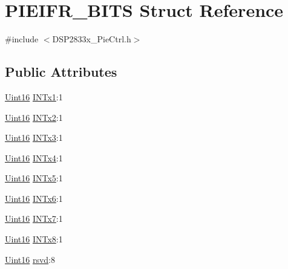 \hypertarget{struct_p_i_e_i_f_r___b_i_t_s}{}\section{P\+I\+E\+I\+F\+R\+\_\+\+B\+I\+T\+S Struct Reference}
\label{struct_p_i_e_i_f_r___b_i_t_s}


{\ttfamily \#include $<$D\+S\+P2833x\+\_\+\+Pie\+Ctrl.\+h$>$}

\subsection*{Public Attributes}
\begin{DoxyCompactItemize}
\item 
\hyperlink{_d_s_p2833x___device_8h_a59a9f6be4562c327cbfb4f7e8e18f08b}{Uint16} \hyperlink{struct_p_i_e_i_f_r___b_i_t_s_ac98c3f5b3053bcaadf1e18889c9de82b}{I\+N\+Tx1}\+:1
\item 
\hyperlink{_d_s_p2833x___device_8h_a59a9f6be4562c327cbfb4f7e8e18f08b}{Uint16} \hyperlink{struct_p_i_e_i_f_r___b_i_t_s_aa02d6b97867ac7ed52444a0cf5d91287}{I\+N\+Tx2}\+:1
\item 
\hyperlink{_d_s_p2833x___device_8h_a59a9f6be4562c327cbfb4f7e8e18f08b}{Uint16} \hyperlink{struct_p_i_e_i_f_r___b_i_t_s_a7cd80ab02e8573ae952dfa70df1ee056}{I\+N\+Tx3}\+:1
\item 
\hyperlink{_d_s_p2833x___device_8h_a59a9f6be4562c327cbfb4f7e8e18f08b}{Uint16} \hyperlink{struct_p_i_e_i_f_r___b_i_t_s_a233f92aa6c19b0ec635b016b2dfcde85}{I\+N\+Tx4}\+:1
\item 
\hyperlink{_d_s_p2833x___device_8h_a59a9f6be4562c327cbfb4f7e8e18f08b}{Uint16} \hyperlink{struct_p_i_e_i_f_r___b_i_t_s_a96f8377418eba46dfd0dfdd96c6b3bfc}{I\+N\+Tx5}\+:1
\item 
\hyperlink{_d_s_p2833x___device_8h_a59a9f6be4562c327cbfb4f7e8e18f08b}{Uint16} \hyperlink{struct_p_i_e_i_f_r___b_i_t_s_a3f4032509ff63b4a2c9901d059e1987e}{I\+N\+Tx6}\+:1
\item 
\hyperlink{_d_s_p2833x___device_8h_a59a9f6be4562c327cbfb4f7e8e18f08b}{Uint16} \hyperlink{struct_p_i_e_i_f_r___b_i_t_s_a58d5d27b316a21f33dd92973c3ea1bb8}{I\+N\+Tx7}\+:1
\item 
\hyperlink{_d_s_p2833x___device_8h_a59a9f6be4562c327cbfb4f7e8e18f08b}{Uint16} \hyperlink{struct_p_i_e_i_f_r___b_i_t_s_ab8339a5276d9f4f5507607809e36ac73}{I\+N\+Tx8}\+:1
\item 
\hyperlink{_d_s_p2833x___device_8h_a59a9f6be4562c327cbfb4f7e8e18f08b}{Uint16} \hyperlink{struct_p_i_e_i_f_r___b_i_t_s_a320475e23a9bbe2fe16e56d2a080d39e}{rsvd}\+:8
\end{DoxyCompactItemize}


